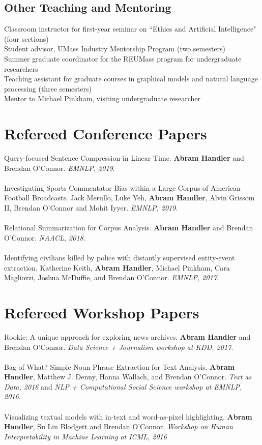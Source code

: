 \documentclass[10pt, a4paper]{article}
\newcommand{\years}[1]{\marginnote{\normalsize #1}}
\begin{document}
\subsection*{Other Teaching and Mentoring}

\years{2019} Classroom instructor for first-year seminar on ``Ethics and Artificial Intelligence" (four sections)  \\
\years{2018 - 2019} Student advisor, UMass Industry Mentorship Program (two semesters) \\
\years{2017} Summer graduate coordinator for the REUMass program for undergraduate researchers \\ 
\years{2016-2018} Teaching assistant for graduate courses in graphical models and natural language processing (three semesters) \\
\years{2016} Mentor to Michael Pinkham, visiting undergraduate researcher

\section*{Refereed Conference Papers}

Query-focused Sentence Compression in Linear Time. \textbf{Abram Handler} and Brendan O'Connor. \textit{EMNLP, 2019}.\\ \\
Investigating Sports Commentator Bias within a Large Corpus of American Football Broadcasts. Jack Merullo, Luke Yeh, \textbf{Abram Handler}, Alvin Grissom II, Brendan O'Connor and Mohit Iyyer. \textit{EMNLP, 2019}.\\ \\
Relational Summarization for Corpus Analysis. \textbf{Abram Handler} and Brendan O'Connor. \textit{NAACL, 2018}.\\ \\
Identifying civilians killed by police with distantly supervised entity-event extraction. Katherine Keith, \textbf{Abram Handler}, Michael Pinkham, Cara Magliozzi, Joshua McDuffie, and Brendan O'Connor. \textit{EMNLP, 2017}. 

\section*{Refereed Workshop Papers}

Rookie: A unique approach for exploring news archives. \textbf{Abram Handler} and Brendan O'Connor. \textit{Data Science + Journalism workshop at KDD, 2017}. \\ \\ 
Bag of What? Simple Noun Phrase Extraction for Text Analysis. \textbf{Abram Handler}, Matthew J. Denny, Hanna Wallach, and Brendan O'Connor. \textit{Text as Data, 2016} and \textit{NLP + Computational Social Science workshop at EMNLP, 2016}.\\ \\
Visualizing textual models with in-text and word-as-pixel highlighting.  \textbf{Abram Handler}, Su Lin Blodgett and Brendan O'Connor. \textit{Workshop on Human Interpretability in Machine Learning at ICML, 2016} 
\end{document}
